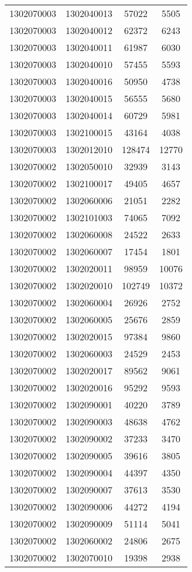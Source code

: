 \begin{longtable}{llcc}
1302070003 & 1302040013 & 57022 & 5505\\
1302070003 & 1302040012 & 62372 & 6243\\
1302070003 & 1302040011 & 61987 & 6030\\
1302070003 & 1302040010 & 57455 & 5593\\
1302070003 & 1302040016 & 50950 & 4738\\
1302070003 & 1302040015 & 56555 & 5680\\
1302070003 & 1302040014 & 60729 & 5981\\
1302070003 & 1302100015 & 43164 & 4038\\
1302070003 & 1302012010 & 128474 & 12770\\
1302070002 & 1302050010 & 32939 & 3143\\
1302070002 & 1302100017 & 49405 & 4657\\
1302070002 & 1302060006 & 21051 & 2282\\
1302070002 & 1302101003 & 74065 & 7092\\
1302070002 & 1302060008 & 24522 & 2633\\
1302070002 & 1302060007 & 17454 & 1801\\
1302070002 & 1302020011 & 98959 & 10076\\
1302070002 & 1302020010 & 102749 & 10372\\
1302070002 & 1302060004 & 26926 & 2752\\
1302070002 & 1302060005 & 25676 & 2859\\
1302070002 & 1302020015 & 97384 & 9860\\
1302070002 & 1302060003 & 24529 & 2453\\
1302070002 & 1302020017 & 89562 & 9061\\
1302070002 & 1302020016 & 95292 & 9593\\
1302070002 & 1302090001 & 40220 & 3789\\
1302070002 & 1302090003 & 48638 & 4762\\
1302070002 & 1302090002 & 37233 & 3470\\
1302070002 & 1302090005 & 39616 & 3805\\
1302070002 & 1302090004 & 44397 & 4350\\
1302070002 & 1302090007 & 37613 & 3530\\
1302070002 & 1302090006 & 44272 & 4194\\
1302070002 & 1302090009 & 51114 & 5041\\
1302070002 & 1302060002 & 24806 & 2675\\
1302070002 & 1302070010 & 19398 & 2938\\

\end{longtable}
